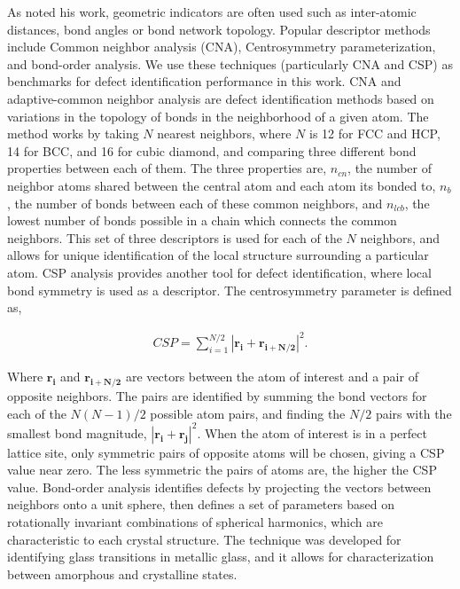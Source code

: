 \documentclass[12pt]{iopart}
\begin{document}
As noted his work, geometric indicators are often used such as inter-atomic distances, bond angles or bond network topology. Popular descriptor methods include Common neighbor analysis (CNA)\cite{Honeycutt1987}, Centrosymmetry parameterization\cite{Kelchner1998}, and bond-order analysis\cite{Steinhardt1983}. We use these techniques (particularly CNA and CSP) as benchmarks for defect identification performance in this work. CNA and adaptive-common neighbor analysis \cite{Stukowski2012} are defect identification methods based on variations in the topology of bonds in the neighborhood of a given atom. The method works by taking $N$ nearest neighbors, where $N$ is 12 for FCC and HCP, 14 for BCC, and 16 for cubic diamond, and comparing three different bond properties between each of them. The three properties are, $n_{cn}$, the number of neighbor atoms shared between the central atom and each atom its bonded to, $n_b$, the number of bonds between each of these common neighbors, and $n_{lcb}$, the lowest number of bonds possible in a chain which connects the common neighbors. This set of three descriptors is used for each of the $N$ neighbors, and allows for unique identification of the local structure surrounding a particular atom. CSP\cite{Kelchner1998} analysis provides another tool for defect identification, where local bond symmetry is used as a descriptor. The centrosymmetry parameter is defined as,
\begin{center}
\begin{eqnarray}
CSP = \sum_{i=1}^{N/2}|\mathbf{r_i}+\mathbf{r_{i+N/2}}|^2. 
\end{eqnarray}
\end{center}

Where $\mathbf{r_i}$ and $\mathbf{r_{i+N/2}}$ are vectors between the atom of interest and a pair of opposite neighbors. The pairs are identified by summing the bond vectors for each of the $N(N-1)/2$ possible atom pairs, and finding the $N/2$ pairs with the smallest bond magnitude, $|\mathbf{r_i} + \mathbf{r_j}|^2$. When the atom of interest is in a perfect lattice site, only symmetric pairs of opposite atoms will be chosen, giving a CSP value near zero. The less symmetric the pairs of atoms are, the higher the CSP value. Bond-order analysis \cite{Steinhardt1983} identifies defects by projecting the vectors between neighbors onto a unit sphere, then defines a set of parameters based on rotationally invariant combinations of spherical harmonics, which are characteristic to each crystal structure. The technique was developed for identifying glass transitions in metallic glass, and it allows for characterization between amorphous and crystalline states.
\end{document}
